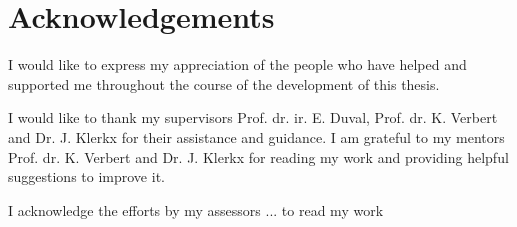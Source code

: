\chapter*{Acknowledgements}


I would like to express my appreciation of the people who have helped and supported me throughout the course of the development of this thesis.

I would like to thank my supervisors Prof. dr. ir. E. Duval, Prof. dr. K. Verbert and Dr. J. Klerkx for their assistance and guidance. I am grateful to my mentors Prof. dr. K. Verbert and Dr. J. Klerkx for reading my work and providing helpful suggestions to improve it.

I acknowledge the efforts by my assessors ... to read my work


